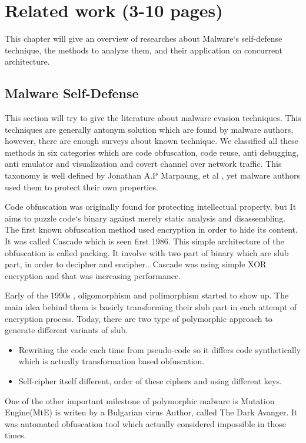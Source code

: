 \chapter{Related work (3-10 pages)}
This chapter will give an overview of researches about Malware`s self-defense technique, the methods to analyze them, and their application on concurrent architecture. 

\section{Malware Self-Defense}
This section will try to give the literature about malware evasion techniques. This techniques are generally antonym solution which are found by malware authors, however, there are enough surveys about known technique. We classified all these methods in six categories which are code obfuscation, code reuse, anti debugging, anti emulator and visualization and covert channel over network traffic. This taxonomy is well defined by Jonathan A.P Marpaung, et al \cite{marpaung2012survey}, yet malware authors used them to protect their own properties. 


Code obfuscation was originally  found for protecting intellectual property\cite{balakrishnan2005code}, but It aims to puzzle code`s binary against merely static analysis and disassembling\cite{nachenberg1996understanding}. The first known obfuscation method used encryption in order to hide its content. It was called Cascade which is seen first 1986\cite{you2010malware}. This simple architecture of the obfuscation is called packing\cite{internotsecurityteam}. It involve with two part of binary which are slub part, in order to decipher and encipher.\cite{marpaung2012survey}. Cascade was using simple XOR encryption and that was increasing performance.

Early of the 1990s , oligomorphism and polimorphism started to show up\cite{you2010malware}. The main idea behind them is basicly transforming their slub part in each attempt of encryption process\cite{nachenberg1996understanding}. Today, there are two type of  polymorphic approach to generate different variants of slub.\cite{li2011mechanisms}
\begin{itemize}
  \item Rewriting the code each time from pseudo-code so it differs code synthetically which is actually transformation based obfuscation.
  \item Self-cipher itself different, order of these ciphers and using different keys.
\end{itemize}
One of the other important milestone of polymorphic malware is Mutation Engine(MtE) is writen by a Bulgarian virus Author, called The Dark Avanger. It was automated obfuscation tool which actually considered impossible in those times.\cite{anonymous1}

